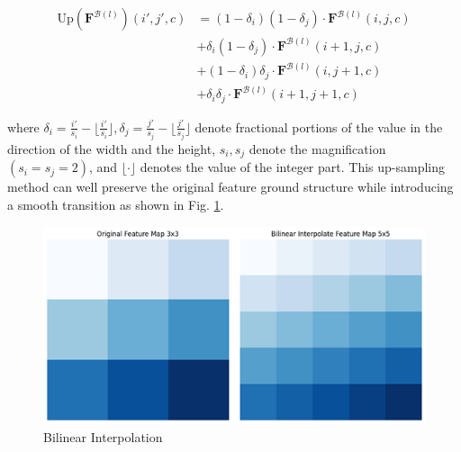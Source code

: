 \begin{equation}
\label{eq4}
  \begin{aligned}
    \mbox{Up}(\mathbf{F}^{\mathcal{B}(l)})(i', j', c) &= (1-\delta_i)(1-\delta_j)\cdot \mathbf{F}^{\mathcal{B}(l)}(i, j, c)\\
    &+\delta_i(1-\delta_j)\cdot \mathbf{F}^{\mathcal{B}(l)}(i+1, j, c) \\
    &+(1-\delta_i)\delta_j\cdot \mathbf{F}^{\mathcal{B}(l)}(i, j+1, c) \\
    &+\delta_i \delta_j \cdot \mathbf{F}^{\mathcal{B}(l)}(i+1, j+1, c)
  \end{aligned}
\end{equation}

where $\delta_i=\frac{i'}{s_i} - \lfloor \frac{i'}{s_i} \rfloor, \delta_j = \frac{j'}{s_j} - \lfloor \frac{j'}{s_j} \rfloor$ denote fractional portions of the value in the direction of the width and the height, $s_i,s_j$ denote the magnification $(s_i = s_j = 2)$, and $\lfloor \cdot \rfloor$ denotes the value of the integer part. This up-sampling method can well preserve the original feature ground structure while introducing a smooth transition as shown in Fig. \ref{fig:bilinear}. 

\begin{figure}[htbp]
  \begin{center}
      \includegraphics[scale=0.8]{figure/bilinear.png}
  \end{center}
  \caption{Bilinear Interpolation}
  \label{fig:bilinear}
\end{figure}

